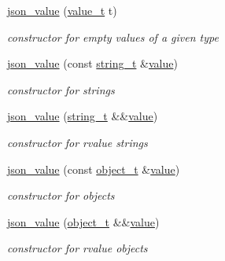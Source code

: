 \begin{DoxyCompactItemize}
\hyperlink{unionnlohmann_1_1basic__json_1_1json__value_a34114e47b2d6391ba97678cefef700c4}{json\+\_\+value} (\hyperlink{namespacenlohmann_1_1detail_a1ed8fc6239da25abcaf681d30ace4985}{value\+\_\+t} t)
\begin{DoxyCompactList}\small\item\em constructor for empty values of a given type \end{DoxyCompactList}\item 
\hyperlink{unionnlohmann_1_1basic__json_1_1json__value_a8f75abc358ee45b9bbdc601c974d6c91}{json\+\_\+value} (const \hyperlink{classnlohmann_1_1basic__json_a61f8566a1a85a424c7266fb531dca005}{string\+\_\+t} \&\hyperlink{classnlohmann_1_1basic__json_a404017aa52714a0a4bc79d5af7e4ad2b}{value})
\begin{DoxyCompactList}\small\item\em constructor for strings \end{DoxyCompactList}\item 
\hyperlink{unionnlohmann_1_1basic__json_1_1json__value_ab9c8696a9477ec8a9bce79dec04ef418}{json\+\_\+value} (\hyperlink{classnlohmann_1_1basic__json_a61f8566a1a85a424c7266fb531dca005}{string\+\_\+t} \&\&\hyperlink{classnlohmann_1_1basic__json_a404017aa52714a0a4bc79d5af7e4ad2b}{value})
\begin{DoxyCompactList}\small\item\em constructor for rvalue strings \end{DoxyCompactList}\item 
\hyperlink{unionnlohmann_1_1basic__json_1_1json__value_a74330ab1bc8ce1d0c6e2ee711c150563}{json\+\_\+value} (const \hyperlink{classnlohmann_1_1basic__json_a0322396ca5cd4623bc816bf735377623}{object\+\_\+t} \&\hyperlink{classnlohmann_1_1basic__json_a404017aa52714a0a4bc79d5af7e4ad2b}{value})
\begin{DoxyCompactList}\small\item\em constructor for objects \end{DoxyCompactList}\item 
\hyperlink{unionnlohmann_1_1basic__json_1_1json__value_a82815d53bd7c983995fbcbe85131a110}{json\+\_\+value} (\hyperlink{classnlohmann_1_1basic__json_a0322396ca5cd4623bc816bf735377623}{object\+\_\+t} \&\&\hyperlink{classnlohmann_1_1basic__json_a404017aa52714a0a4bc79d5af7e4ad2b}{value})
\begin{DoxyCompactList}\small\item\em constructor for rvalue objects \end{DoxyCompactList}\item 

\end{DoxyCompactItemize}
